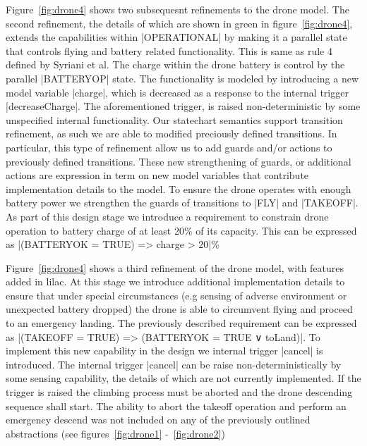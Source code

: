 Figure~\ref{fig:drone4} shows two subsequesnt refinements to the drone model.
The second refinement, the details of which are shown in green in figure~\ref{fig:drone4}, 
extends the capabilities within |OPERATIONAL| by making it a parallel
state that controls flying and battery related functionality. This is same as rule 4 defined by Syriani et al.
The charge within the drone battery is control by the parallel |BATTERYOP| state. 
The functionality is modeled by introducing a new model variable |charge|, which is decreased as 
a response to the internal trigger |decreaseCharge|. The aforementioned trigger, is raised non-deterministic by some 
unspecified internal functionality. Our statechart semantics support transition refinement, as such
we are able to modified preciously defined transitions. In particular, this type of refinement allow
us to add guards and/or actions to previously defined transitions. These new strengthening of guards, or additional 
actions are expression in term on new model variables that contribute implementation details to the model.
To ensure the drone operates with enough battery power we strengthen the guards of transitions to |FLY| and |TAKEOFF|.
As part of this design stage we introduce a requirement to constrain drone operation to battery charge of 
at least 20\% of its capacity. This can be expressed as |(BATTERYOK = TRUE) => charge > 20|\%



Figure~\ref{fig:drone4} shows a third refinement of the drone model, with features added in lilac.
At this stage we introduce additional implementation details to ensure that under special 
circumstances (e.g sensing of adverse environment or unexpected battery dropped) the drone is able 
to circumvent flying and proceed to an emergency landing. The previously described requirement can be
expressed as |(TAKEOFF = TRUE) => (BATTERYOK = TRUE ∨ toLand)|.
To implement this new capability in the design we internal trigger |cancel| is introduced.
The internal trigger |cancel| can be raise non-deterministically by some sensing capability, 
the details of which are not currently implemented. If the trigger is raised the climbing process 
must be aborted and the drone descending sequence shall start. The ability to abort the 
takeoff operation and perform an emergency descend was not included on 
any of the previously outlined abstractions (see figures~\ref{fig:drone1} -~\ref{fig:drone2}) 


